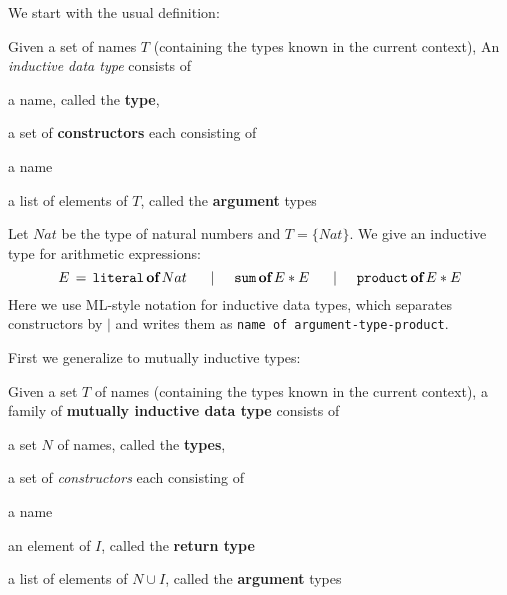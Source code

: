 We start with the usual definition:

\begin{definition}
Given a set of names $T$ (containing the types known in the current context), An \emph{inductive data type} consists of
\begin{compactitem}
 \item a name, called the \textbf{type},
 \item a set of \textbf{constructors} each consisting of
 \begin{compactitem}
  \item a name
  \item a list of elements of $T$, called the \textbf{argument} types
 \end{compactitem} 
\end{compactitem}
\end{definition}

\newcommand{\cons}[2]{\mathtt{#1}\,\kw{of}\,\fold{*}{#2}}
\newcommand{\indtype}[2]{#1\,=\,\fold{\;\tb|\tb}{#2}}
\newcommand{\consnot}[3]{\mathtt{#1}\,\kw{of}\,\fold{*}{#2}\,\#\,#3}
\newcommand{\consn}[2]{\mathtt{#1}\,\#\,#2}

\begin{example}
Let $Nat$ be the type of natural numbers and $T=\{Nat\}$.
We give an inductive type for arithmetic expressions:
\[
\indtype{E}{\cons{literal}{Nat}, \cons{sum}{E,E}, \cons{product}{E,E}} \\
\]
Here we use ML-style notation for inductive data types, which separates constructors by $|$ and writes them as \texttt{name of argument-type-product}.
\end{example}

First we generalize to mutually inductive types:

\begin{definition}
Given a set $T$ of names (containing the types known in the current context), a family of \textbf{mutually inductive data type} consists of
\begin{compactitem}
 \item a set $N$ of names, called the \textbf{types},
 \item a set of \emph{constructors} each consisting of
 \begin{compactitem}
  \item a name
  \item an element of $I$, called the \textbf{return type}
  \item a list of elements of $N\cup I$, called the \textbf{argument} types
 \end{compactitem} 
\end{compactitem}
\end{definition}

